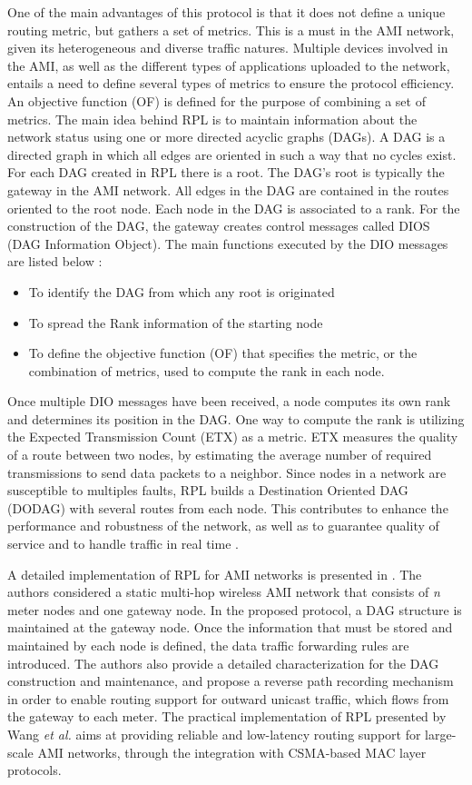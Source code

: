\documentclass[11pt,draftclsnofoot,onecolumn]{IEEEtran}
\begin{document}
One of the main advantages of this protocol is that it does not define a unique routing metric, but gathers a set of metrics. This is a must in the AMI network, given its heterogeneous and diverse traffic natures. Multiple devices involved in the AMI, as well as the different types of applications uploaded to the network, entails a need to define several types of metrics to ensure the protocol efficiency. An objective function (OF) is defined for the purpose of combining a set of metrics. The main idea behind RPL is to maintain information about the network status using one or more directed acyclic graphs (DAGs). A DAG is a directed graph in which all edges are oriented in such a way that no cycles exist. For each DAG created in RPL there is a root. The DAG’s root is typically the gateway in the AMI network. All edges in the DAG are contained in the routes oriented to the root node. Each node in the DAG is associated to a rank. For the construction of the DAG, the gateway creates control messages called DIOS (DAG Information Object). The main functions executed by the DIO messages are listed below  \cite{Iyer2011a}:

\begin{itemize}
	\item To identify the DAG from which any root is originated
	\item To spread the Rank information of the starting node
	\item To define the objective function (OF) that specifies the metric, or the combination of metrics, used to compute the rank in each node.
\end{itemize}

Once multiple DIO messages have been received, a node computes its own rank and determines its position in the DAG. One way to compute the rank is utilizing the Expected Transmission Count (ETX) as a metric. ETX measures the quality of a route between two nodes, by estimating the average number of required transmissions to send data packets to a neighbor. Since nodes in a network are susceptible to multiples faults, RPL builds a Destination Oriented DAG (DODAG) with several routes from each node. This contributes to enhance the performance and robustness of the network, as well as to guarantee quality of service and to handle traffic in real time  \cite{Pavkovic2011}.

A detailed implementation of RPL for AMI networks is presented in \cite{Wang2010}. The authors considered a static multi-hop wireless AMI network that consists of \textit{n} meter nodes and one gateway node. In the proposed protocol, a DAG structure is maintained at the gateway node. Once the information that must be stored and maintained by each node is defined, the data traffic forwarding rules are introduced. The authors also provide a detailed characterization for the DAG construction and maintenance, and propose a reverse path recording mechanism in order to enable routing support for outward unicast traffic, which flows from the gateway to each meter. The practical implementation of RPL presented by Wang \textit{et al.} aims at providing reliable and low-latency routing support for large-scale AMI networks, through the integration with CSMA-based MAC layer protocols. 
\end{document}
